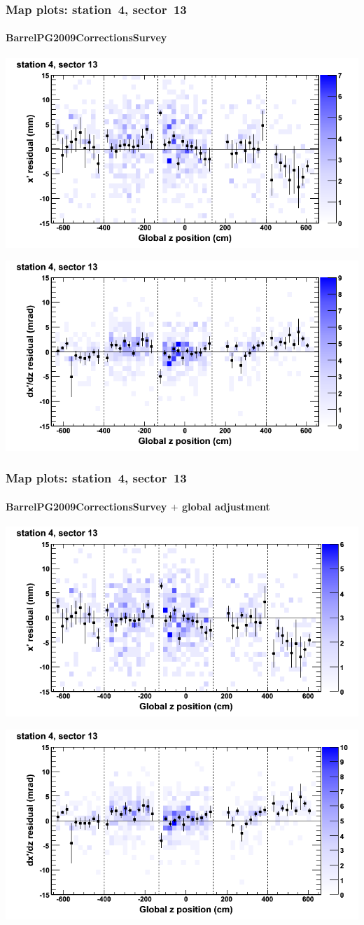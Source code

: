 \documentclass[compress]{beamer}
\begin{document}
\begin{frame}
\frametitle{Map plots: station~4, sector~13}
\framesubtitle{BarrelPG2009CorrectionsSurvey}
\includegraphics[width=0.5\linewidth]{mapplots_01/DTvsz_st4sec13_x.png}

\includegraphics[width=0.5\linewidth]{mapplots_01/DTvsz_st4sec13_dxdz.png}
\end{frame}
\begin{frame}
\frametitle{Map plots: station~4, sector~13}
\framesubtitle{BarrelPG2009CorrectionsSurvey $+$ global adjustment}
\includegraphics[width=0.5\linewidth]{mapplots_re01/DTvsz_st4sec13_x.png}

\includegraphics[width=0.5\linewidth]{mapplots_re01/DTvsz_st4sec13_dxdz.png}
\end{frame}
\end{document}
